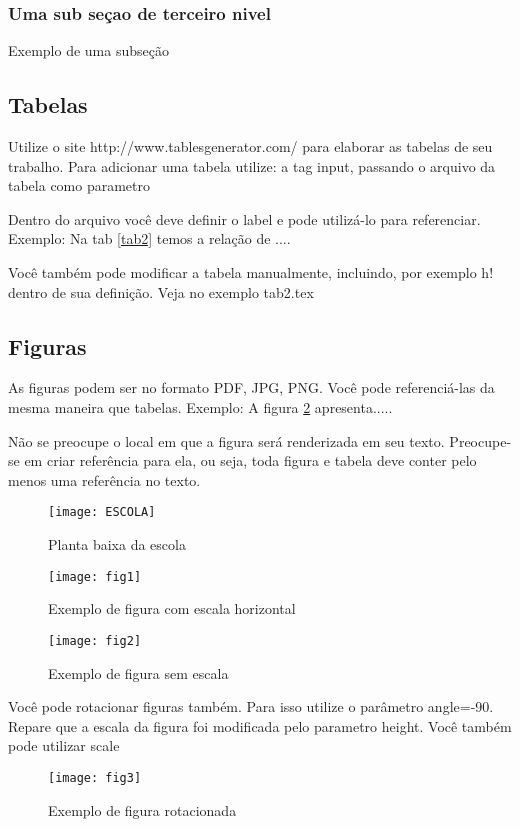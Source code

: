 \documentclass[	DIV=calc,%
							paper=a4,%
							fontsize=12pt,%
							onecolumn]{scrartcl}	 					%
\begin{document}
\subsubsection{Uma sub seçao de terceiro nivel}

Exemplo de uma subseção

\subsection{Tabelas}

Utilize o site http://www.tablesgenerator.com/ para elaborar as tabelas de seu trabalho.
Para adicionar uma tabela utilize: a tag input, passando o arquivo da tabela como parametro



Dentro do arquivo você deve definir o label e pode utilizá-lo para referenciar. Exemplo:
Na tab \ref{tab2} temos a relação de ....


Você também pode modificar a tabela manualmente, incluindo, por exemplo h! dentro de sua definição. Veja no exemplo tab2.tex

\subsection{Figuras}

As figuras podem ser no formato PDF, JPG, PNG. Você pode referenciá-las da mesma maneira que tabelas. Exemplo: A figura \ref{fig1} apresenta.....

Não se preocupe o local em que a figura será renderizada em seu texto. Preocupe-se em criar referência para ela, ou seja, toda figura e tabela deve conter pelo menos uma referência no texto.

\begin{figure}
	\centering
	\texttt{[image: ESCOLA]}
	\caption{Planta baixa da escola}
	\label{ESCOLA}
\end{figure}

\begin{figure}
\centering
\texttt{[image: fig1]}
\caption{Exemplo de figura com escala horizontal}
\label{fig1}
\end{figure}


\begin{figure}
	\centering
	\texttt{[image: fig2]}
	\caption{Exemplo de figura sem escala}
	\label{fig2}
\end{figure}

Você pode rotacionar figuras também. Para isso utilize o parâmetro angle=-90. Repare que a escala da figura foi modificada pelo parametro height. Você também pode utilizar scale

\begin{figure}
	\centering
	\texttt{[image: fig3]}
	\caption{Exemplo de figura rotacionada}
	\label{fig3}
\end{figure}


\end{document}
